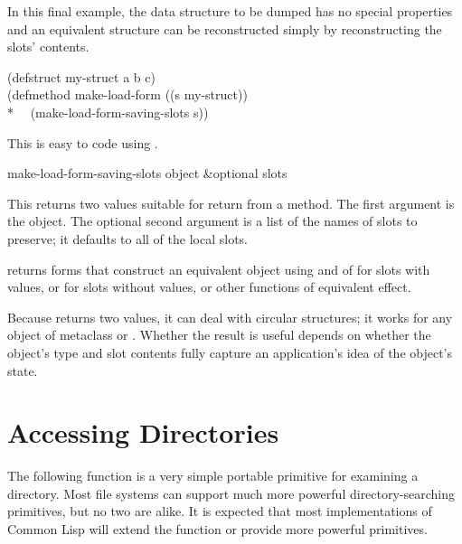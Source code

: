 \begin{newer}
\begin{defun}
  In this final example, the data structure to be dumped has no special
  properties and an equivalent structure can be reconstructed
  simply by reconstructing the slots' contents.
\begin{lisp}
(defstruct my-struct a b c) \\[2pt]
(defmethod make-load-form ((s my-struct)) \\*
~~(make-load-form-saving-slots s))
\end{lisp}
This is easy to code using .
\end{defun}

\begin{defun}[Function]
make-load-form-saving-slots object &optional slots

This returns two values suitable for return from a  method.
  The first argument is the object.  The optional second argument is a
  list of the names of slots to preserve; it defaults to all of the
  local slots.

 returns forms that construct
  an equivalent object using 
  and  of  for
  slots with values, or  for slots without values, or
  other functions of equivalent effect.

  Because  returns two values, it can deal with
  circular structures; it works for any object
  of metaclass  or .
  Whether the result is
  useful depends on whether the object's type and slot
  contents fully capture an application's idea of the object's state.
\end{defun}
\end{newer}


\section {Accessing Directories}

The following function is a very simple portable primitive for examining
a directory.  Most file systems can support much more powerful
directory-searching primitives, but no two are alike.
It is expected that most implementations of Common Lisp will extend the
 function or provide more powerful
primitives.

